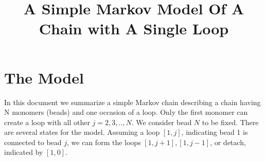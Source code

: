 \documentclass[12pt]{article}
\begin{document}
\section{The Model}
\title{A Simple Markov Model Of A Chain with A Single Loop}
\maketitle
In this document we summarize a simple Markov chain describing a chain having N monomers (beads) and one occasion of a loop. Only the first monomer can create a loop with all other $j=2,3,..,N$. We consider bead $N$ to be fixed. 
There are several states for the model. Assuming a loop $[1,j]$, indicating bead 1 is connected to bead $j$, we can form the loops $[1,j+1],[1,j-1]$, or detach, indicated by $[1,0]$. 
\end{document}
